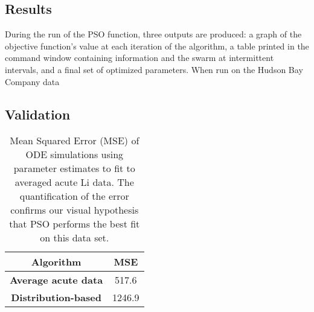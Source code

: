 \documentclass{article}
\begin{document}
\subsection{Results}
During the run of the PSO function, three outputs are produced: a graph of the objective function's value at each iteration of the algorithm, a table printed in the command window containing information and the swarm at intermittent intervals, and a final set of optimized parameters.
When run on the Hudson Bay Company data 
\subsection{Validation}

\begin{table}[H]
  \begin{center}
    \label{tab:table1}
    \begin{tabular}{c|c} %
      \textbf{Algorithm} & \textbf{MSE} \\
      \hline
      \textbf{Average acute data} & 517.6\\
      \textbf{Distribution-based} & 1246.9\\
    \end{tabular}
    \caption{Mean Squared Error (MSE) of ODE simulations using parameter estimates to fit to averaged acute Li data. The quantification of the error confirms our visual hypothesis that PSO performs the best fit on this data set.}
  \end{center}
\end{table}
\end{document}
